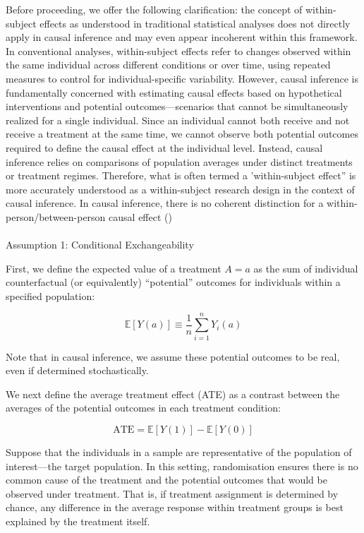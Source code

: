 \documentclass[
  singlecolumn]{article}
\makeatletter
\let\oldparagraph\paragraph
\renewcommand{\paragraph}{
    \@ifstar
      \xxxParagraphStar
      \xxxParagraphNoStar
  }
\newcommand{\xxxParagraphStar}[1]{\oldparagraph*{#1}\mbox{}}
\newcommand{\xxxParagraphNoStar}[1]{\oldparagraph{#1}\mbox{}}
\makeatother
\begin{document}
Before proceeding, we offer the following clarification: the concept of
within-subject effects as understood in traditional statistical analyses
does not directly apply in causal inference and may even appear
incoherent within this framework. In conventional analyses,
within-subject effects refer to changes observed within the same
individual across different conditions or over time, using repeated
measures to control for individual-specific variability. However, causal
inference is fundamentally concerned with estimating causal effects
based on hypothetical interventions and potential outcomes---scenarios
that cannot be simultaneously realized for a single individual. Since an
individual cannot both receive and not receive a treatment at the same
time, we cannot observe both potential outcomes required to define the
causal effect at the individual level. Instead, causal inference relies
on comparisons of population averages under distinct treatments or
treatment regimes. Therefore, what is often termed a 'within-subject
effect'' is more accurately understood as a within-subject research
design in the context of causal inference. In causal inference, there is
no coherent distinction for a within-person/between-person causal effect
()

\paragraph{Assumption 1: Conditional
Exchangeability}\label{assumption-1-conditional-exchangeability}

First, we define the expected value of a treatment \(A=a\) as the sum of
individual counterfactual (or equivalently) ``potential'' outcomes for
individuals within a specified population:

\[
\mathbb{E}[Y(a)] \equiv \frac{1}{n} \sum_{i=1}^n Y_i(a)
\]

Note that in causal inference, we assume these potential outcomes to be
real, even if determined stochastically.

We next define the average treatment effect (ATE) as a contrast between
the averages of the potential outcomes in each treatment condition:

\[
\text{ATE} = \mathbb{E}[Y(1)] - \mathbb{E}[Y(0)]
\]

Suppose that the individuals in a sample are representative of the
population of interest---the target population. In this setting,
randomisation ensures there is no common cause of the treatment and the
potential outcomes that would be observed under treatment. That is, if
treatment assignment is determined by chance, any difference in the
average response within treatment groups is best explained by the
treatment itself.
\end{document}
